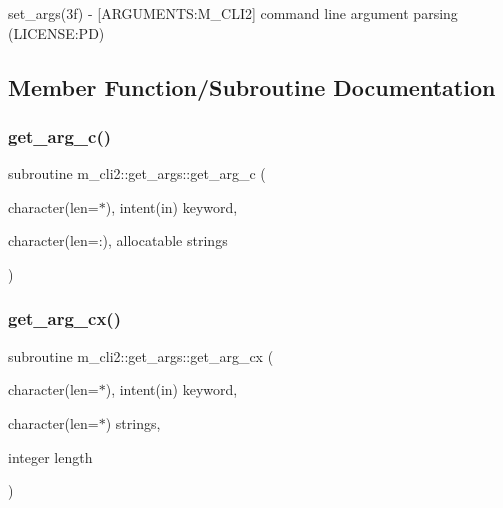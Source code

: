 \begin{DoxyCompactItemize}
\begin{DoxyCompactList}
set\+\_\+args(3f) -\/ \mbox{[}A\+R\+G\+U\+M\+E\+N\+TS\+:M\+\_\+\+C\+L\+I2\mbox{]} command line argument parsing (L\+I\+C\+E\+N\+SE\+:PD) \end{DoxyCompactList}\end{DoxyCompactItemize}


\subsection{Member Function/\+Subroutine Documentation}
\mbox{\label{interfacem__cli2_1_1get__args_a64eadcbcf0b4b812c95072483499df09}} 
\subsubsection{\texorpdfstring{get\+\_\+arg\+\_\+c()}{get\_arg\_c()}}
{\footnotesize\ttfamily subroutine m\+\_\+cli2\+::get\+\_\+args\+::get\+\_\+arg\+\_\+c (\begin{DoxyParamCaption}\item[{character(len=$\ast$), intent(in)}]{keyword,  }\item[{character(len=\+:), allocatable}]{strings }\end{DoxyParamCaption})\hspace{0.3cm}{\ttfamily [private]}}

\mbox{\label{interfacem__cli2_1_1get__args_a06ee25c1638081a2d358b65ee27683c9}} 
\subsubsection{\texorpdfstring{get\+\_\+arg\+\_\+cx()}{get\_arg\_cx()}}
{\footnotesize\ttfamily subroutine m\+\_\+cli2\+::get\+\_\+args\+::get\+\_\+arg\+\_\+cx (\begin{DoxyParamCaption}\item[{character(len=$\ast$), intent(in)}]{keyword,  }\item[{character(len=$\ast$)}]{strings,  }\item[{integer}]{length }\end{DoxyParamCaption})\hspace{0.3cm}{\ttfamily [private]}}

